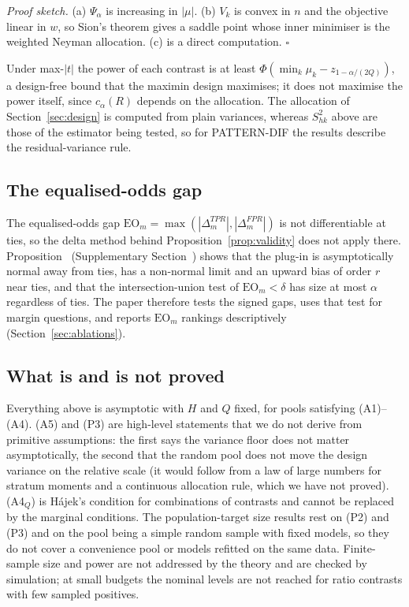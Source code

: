 \emph{Proof sketch.} (a) $\Psi_\alpha$ is increasing in $|\mu|$. (b) $V_k$ is convex in $n$ and the objective linear in $w$, so Sion's theorem \citep{sion1958} gives a saddle point whose inner minimiser is the weighted Neyman allocation. (c) is a direct computation. $\square$

Under max-$|t|$ the power of each contrast is at least $\Phi(\min_k\mu_k-z_{1-\alpha/(2Q)})$, a design-free bound that the maximin design maximises; it does not maximise the power itself, since $c_\alpha(R)$ depends on the allocation. The allocation of Section~\ref{sec:design} is computed from plain variances, whereas $S^2_{hk}$ above are those of the estimator being tested, so for PATTERN-DIF the results describe the residual-variance rule.

\subsection{The equalised-odds gap}\label{sec:test-eo}

The equalised-odds gap $\mathrm{EO}_m=\max(|\Delta^{TPR}_m|,|\Delta^{FPR}_m|)$ is not differentiable at ties, so the delta method behind Proposition~\ref{prop:validity} does not apply there. Proposition~ (Supplementary Section~) shows that the plug-in is asymptotically normal away from ties, has a non-normal limit and an upward bias of order $r$ near ties, and that the intersection-union test of $\mathrm{EO}_m<\delta$ has size at most $\alpha$ regardless of ties. The paper therefore tests the signed gaps, uses that test for margin questions, and reports $\mathrm{EO}_m$ rankings descriptively (Section~\ref{sec:ablations}).

\subsection{What is and is not proved}\label{sec:test-limits}

Everything above is asymptotic with $H$ and $Q$ fixed, for pools satisfying (A1)--(A4). (A5) and (P3) are high-level statements that we do not derive from primitive assumptions: the first says the variance floor does not matter asymptotically, the second that the random pool does not move the design variance on the relative scale (it would follow from a law of large numbers for stratum moments and a continuous allocation rule, which we have not proved). (A4$_Q$) is H\'ajek's condition for combinations of contrasts and cannot be replaced by the marginal conditions. The population-target size results rest on (P2) and (P3) and on the pool being a simple random sample with fixed models, so they do not cover a convenience pool or models refitted on the same data. Finite-sample size and power are not addressed by the theory and are checked by simulation; at small budgets the nominal levels are not reached for ratio contrasts with few sampled positives.
